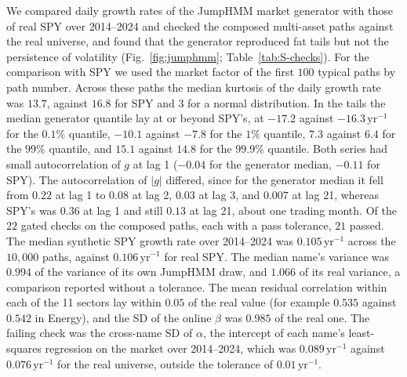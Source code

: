 We compared daily growth rates of the JumpHMM market generator with those of real SPY over 2014--2024 and checked
the composed multi-asset paths against the real universe, and found that the generator reproduced fat tails but not
the persistence of volatility (Fig.~\ref{fig:jumphmm}; Table~\ref{tab:S-checks}). For the comparison with SPY we
used the market factor of the first $100$ typical paths by path number. Across these paths the median kurtosis of
the daily growth rate was $13.7$, against $16.8$ for SPY and $3$ for a normal distribution. In the tails the median
generator quantile lay at or beyond SPY's, at $-17.2$ against $-16.3\,\mathrm{yr}^{-1}$ for the $0.1\%$ quantile,
$-10.1$ against $-7.8$ for the $1\%$ quantile, $7.3$ against $6.4$ for the $99\%$ quantile, and $15.1$ against
$14.8$ for the $99.9\%$ quantile. Both series had small autocorrelation of $g$ at lag 1 ($-0.04$ for the generator
median, $-0.11$ for SPY). The autocorrelation of $|g|$ differed, since for the generator median it fell from $0.22$
at lag 1 to $0.08$ at lag 2, $0.03$ at lag 3, and $0.007$ at lag 21, whereas SPY's was $0.36$ at lag 1 and still
$0.13$ at lag 21, about one trading month.
Of the $22$ gated checks on the composed paths, each with a pass tolerance, $21$ passed. The median synthetic SPY
growth rate over 2014--2024 was $0.105\,\mathrm{yr}^{-1}$ across the $10{,}000$ paths, against
$0.106\,\mathrm{yr}^{-1}$ for real SPY. The median name's variance was $0.994$ of the variance of its own JumpHMM
draw, and $1.066$ of its real variance, a comparison reported without a tolerance. The mean residual correlation
within each of the 11 sectors lay within $0.05$ of the real value (for example $0.535$ against $0.542$ in Energy),
and the SD of the online $\beta$ was $0.985$ of the real one. The failing check was the cross-name SD of $\alpha$,
the intercept of each name's least-squares regression on the market over 2014--2024, which was
$0.089\,\mathrm{yr}^{-1}$ against $0.076\,\mathrm{yr}^{-1}$ for the real universe, outside the tolerance of
$0.01\,\mathrm{yr}^{-1}$.
